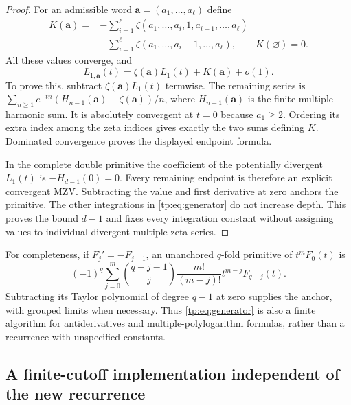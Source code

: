 \begin{proof}
For an admissible word $\boldsymbol a=(a_1,\ldots,a_\ell)$ define
\begin{align*}
 K(\boldsymbol a)={}&-\sum_{i=1}^{\ell}
 \zeta(a_1,\ldots,a_i,1,a_{i+1},\ldots,a_\ell)\\
 &-\sum_{i=1}^{\ell}
 \zeta(a_1,\ldots,a_i+1,\ldots,a_\ell),
 \qquad K(\varnothing)=0.
\end{align*}
All these values converge, and
\[
 L_{1,\boldsymbol a}(t)
       =\zeta(\boldsymbol a)L_1(t)+K(\boldsymbol a)+o(1).
\]
To prove this, subtract $\zeta(\boldsymbol a)L_1(t)$ termwise.
The remaining series is
$\sum_{n\ge1}e^{-tn}(H_{n-1}(\boldsymbol a)-\zeta(\boldsymbol a))/n$,
where $H_{n-1}(\boldsymbol a)$ is the finite multiple harmonic sum.
It is absolutely convergent at $t=0$ because $a_1\ge2$. Ordering its
extra index among the zeta indices gives exactly the two sums defining
$K$. Dominated convergence proves the displayed endpoint formula.

In the complete double primitive the coefficient of the potentially
divergent $L_1(t)$ is $-H_{d-1}(0)=0$. Every remaining endpoint is
therefore an explicit convergent MZV. Subtracting the value and first
derivative at zero anchors the primitive. The other integrations in
\eqref{tp:eq:generator} do not increase depth. This proves the bound
$d-1$ and fixes every integration constant without assigning values
to individual divergent multiple zeta series.
\end{proof}

For completeness, if $F_j'=-F_{j-1}$, an unanchored $q$-fold primitive
of $t^mF_0(t)$ is
\begin{equation}\label{tp:eq:finiteprimitive}
 (-1)^q\sum_{j=0}^m\binom{q+j-1}{j}
       \frac{m!}{(m-j)!}t^{m-j}F_{q+j}(t).
\end{equation}
Subtracting its Taylor polynomial of degree $q-1$ at zero supplies
the anchor, with grouped limits when necessary.  Thus
\eqref{tp:eq:generator} is also a finite algorithm for antiderivatives
and multiple-polylogarithm formulas, rather than a recurrence with
unspecified constants.

\subsection{A finite-cutoff implementation independent of the new recurrence}

